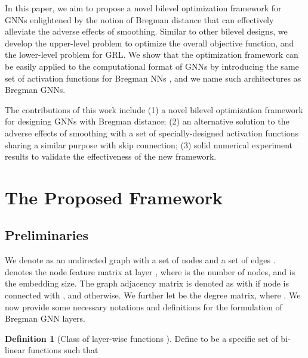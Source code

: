 \documentclass{article}
\begin{document}
In this paper, we aim to propose a novel bilevel optimization framework for GNNs enlightened by the notion of Bregman distance that can effectively alleviate the adverse effects of smoothing. Similar to other bilevel designs, we develop the upper-level problem to optimize the overall objective function, and the lower-level problem for GRL. We show that the optimization framework can be easily applied to the computational format of GNNs by introducing the same set of activation functions for Bregman NNs \cite{frecon2022bregman}, and we name such architectures as Bregman GNNs.

The contributions of this work include (1) a novel bilevel optimization framework for designing GNNs with Bregman distance; (2) an alternative solution to the adverse effects of smoothing with a set of specially-designed activation functions sharing a similar purpose with skip connection;  (3) solid numerical experiment results to validate the effectiveness of the new framework.


















\section{The Proposed Framework}\label{Sec:2}



\subsection{Preliminaries}\label{SubSec:2.1}
We denote   as an undirected graph with a set of nodes  and a set of edges .  denotes the node feature matrix at layer , where  is the number of nodes, and  is the embedding size. The graph adjacency matrix is denoted as  with 
 if node  is connected with , and  otherwise.
We further let  be the degree matrix, where . We now provide some necessary notations and definitions for the formulation of Bregman GNN layers.


\noindent \textbf{Definition 1} (Class of layer-wise functions  \cite{frecon2022bregman}). 
Define  to be a specific set of bi-linear functions such that
\end{document}
